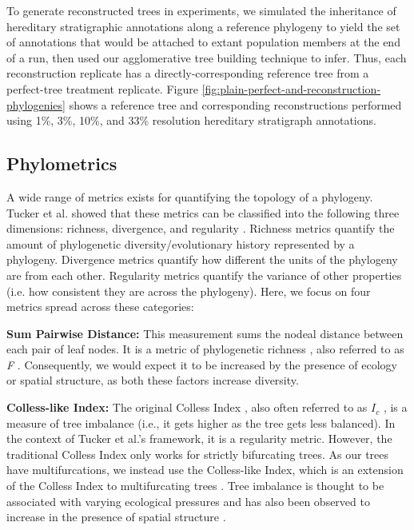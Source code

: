 To generate reconstructed trees in experiments, we simulated the inheritance of hereditary stratigraphic annotations along a reference phylogeny to yield the set of annotations that would be attached to extant population members at the end of a run, then used our agglomerative tree building technique to infer.
Thus, each reconstruction replicate has a directly-corresponding reference tree from a perfect-tree treatment replicate.
Figure \ref{fig:plain-perfect-and-reconstruction-phylogenies} shows a reference tree and corresponding reconstructions performed using 1\%, 3\%, 10\%, and 33\% resolution hereditary stratigraph annotations.

\subsection{Phylometrics}

A wide range of metrics exists for quantifying the topology of a phylogeny.
Tucker et al. showed that these metrics can be classified into the following three dimensions: richness, divergence, and regularity \citep{tuckerGuidePhylogeneticMetrics2017}.
Richness metrics quantify the amount of phylogenetic diversity/evolutionary history represented by a phylogeny.
Divergence metrics quantify how different the units of the phylogeny are from each other.
Regularity metrics quantify the variance of other properties (i.e. how consistent they are across the phylogeny).
Here, we focus on four metrics spread across these categories:

\textbf{Sum Pairwise Distance:} This measurement sums the nodeal distance between each pair of leaf nodes.
It is a metric of phylogenetic richness \citep{tuckerGuidePhylogeneticMetrics2017}, also referred to as \textit{F}  \citep{izsakLinkEcologicalDiversity2000}.
Consequently, we would expect it to be increased by the presence of ecology or spatial structure, as both these factors increase diversity.

\textbf{Colless-like Index:}
The original Colless Index \citep{collessReviewPhylogeneticsTheory1982}, also often referred to as $I_c$ \citep{shaoTreeBalance1990}, is a measure of tree imbalance (i.e., it gets higher as the tree gets less balanced).
In the context of Tucker et al.'s framework, it is a regularity metric.
However, the traditional Colless Index only works for strictly bifurcating trees.
As our trees have multifurcations, we instead use the Colless-like Index, which is an extension of the Colless Index to multifurcating trees \citep{mirSoundCollesslikeBalance2018}.
Tree imbalance is thought to be associated with varying ecological pressures \citep{chamberlainPhylogeneticTreeShape2014, burressEcologicalOpportunityAlters} and has also been observed to increase in the presence of spatial structure \citep{scottInferringTumorProliferative2020}.

